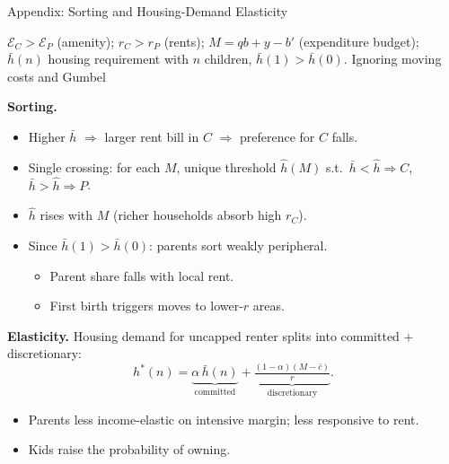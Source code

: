 \documentclass[11pt,aspectratio=169]{beamer}
\begin{document}
\begin{frame}{Appendix: Sorting and Housing-Demand Elasticity}
\label{slide1-main}

\footnotesize

$\mathcal E_C > \mathcal E_P$ (amenity); $r_C > r_P$ (rents); $M = qb + y - b'$ (expenditure budget);\\ $\bar h(n)$ housing requirement with $n$ children, $\bar h(1) > \bar h(0)$. Ignoring moving costs and Gumbel

\vspace{0.3em}
\textbf{Sorting.}
\begin{itemize}\setlength\itemsep{1pt}
  \item Higher $\bar h$ $\Rightarrow$ larger rent bill in $C$ $\Rightarrow$ preference for $C$ falls.
  \item Single crossing: for each $M$, unique threshold $\hat h(M)$ s.t.\ $\bar h < \hat h \Rightarrow C$,\; $\bar h > \hat h \Rightarrow P$.
  \item $\hat h$ rises with $M$ (richer households absorb high $r_C$).
  \item Since $\bar h(1) > \bar h(0)$: parents sort weakly peripheral.
  \begin{itemize}\scriptsize
    \item Parent share falls with local rent.
    \item First birth triggers moves to lower-$r$ areas.
  \end{itemize}
\end{itemize}

\vspace{0.2em}
\textbf{Elasticity.}\;
Housing demand for uncapped renter splits into committed $+$ discretionary:
\vspace{-0.5em}
\[
h^\ast(n) = \underbrace{\alpha\,\bar h(n)}_{\text{committed}} + \underbrace{\tfrac{(1-\alpha)(M-\bar c)}{r}}_{\text{discretionary}}.
\]
\vspace{-0.8em}
  \begin{itemize}\scriptsize
    \item Parents less income-elastic on intensive margin; less responsive to rent.
    \item Kids raise the probability of owning.
  \end{itemize}

\end{frame}
\end{document}
